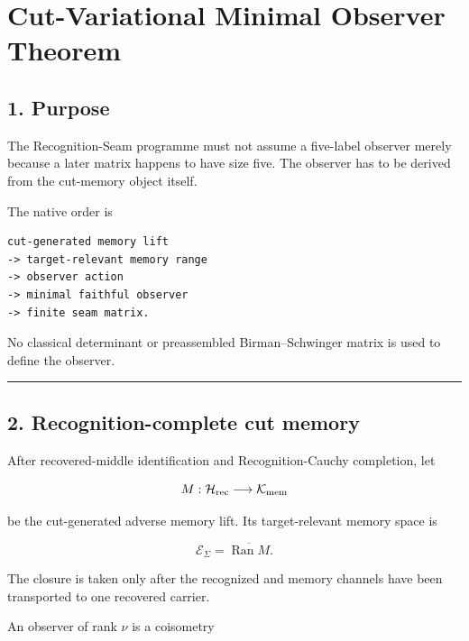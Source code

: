 \hypertarget{cut-variational-minimal-observer-theorem}{%
\chapter{Cut-Variational Minimal Observer Theorem}\label{cut-variational-minimal-observer-theorem}}

\hypertarget{purpose}{%
\section{1. Purpose}\label{purpose}}

The Recognition-Seam programme must not assume a five-label observer merely
because a later matrix happens to have size five. The observer has to be
derived from the cut-memory object itself.

The native order is

\begin{verbatim}
cut-generated memory lift
-> target-relevant memory range
-> observer action
-> minimal faithful observer
-> finite seam matrix.
\end{verbatim}

No classical determinant or preassembled Birman--Schwinger matrix is used to
define the observer.

\begin{center}\rule{0.5\linewidth}{0.5pt}\end{center}

\hypertarget{recognition-complete-cut-memory}{%
\section{2. Recognition-complete cut memory}\label{recognition-complete-cut-memory}}

After recovered-middle identification and Recognition-Cauchy completion, let

\[
M:\mathcal H_{\rm rec}\longrightarrow\mathcal K_{\rm mem}
\]

be the cut-generated adverse memory lift. Its target-relevant memory space is

\[
\boxed{
\mathcal E_\Sigma
=
\overline{\operatorname{Ran}M}.
}
\]

The closure is taken only after the recognized and memory channels have been
transported to one recovered carrier.

An observer of rank \(\nu\) is a coisometry

